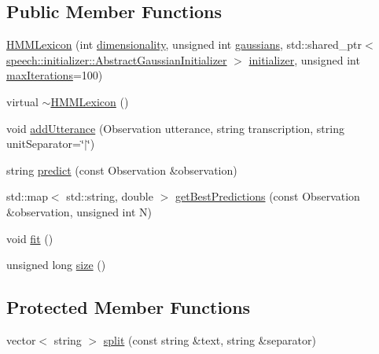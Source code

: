 \subsection*{Public Member Functions}
\begin{DoxyCompactItemize}
\item 
\hyperlink{classspeech_1_1HMMLexicon_a720b99df01bd818f36cd9437ec83ce72}{H\+M\+M\+Lexicon} (int \hyperlink{classspeech_1_1HMMLexicon_a0e8247e6ee089aced3287ec0488e927b}{dimensionality}, unsigned int \hyperlink{classspeech_1_1HMMLexicon_a31c5dc5af41ea8a1f7ef825b2581b4d6}{gaussians}, std\+::shared\+\_\+ptr$<$ \hyperlink{classspeech_1_1initializer_1_1AbstractGaussianInitializer}{speech\+::initializer\+::\+Abstract\+Gaussian\+Initializer} $>$ \hyperlink{classspeech_1_1HMMLexicon_a12d561355a3c03df3d6500c422c1b821}{initializer}, unsigned int \hyperlink{classspeech_1_1HMMLexicon_a4f7a5e08c169ca9f5a389f25c6fc5972}{max\+Iterations}=100)
\item 
virtual \hyperlink{classspeech_1_1HMMLexicon_a07f9cfec2db8467b98c016b7e90f85d8}{$\sim$\+H\+M\+M\+Lexicon} ()
\item 
void \hyperlink{classspeech_1_1HMMLexicon_ae8b1812cf8ee22d64b87861f71f39ce2}{add\+Utterance} (Observation utterance, string transcription, string unit\+Separator=\char`\"{}$\vert$\char`\"{})
\item 
string \hyperlink{classspeech_1_1HMMLexicon_a6c9f0b864f71efd3946f760f3b955c6c}{predict} (const Observation \&observation)
\item 
std\+::map$<$ std\+::string, double $>$ \hyperlink{classspeech_1_1HMMLexicon_ab8d36b52d200a08213577aa72e85dbfe}{get\+Best\+Predictions} (const Observation \&observation, unsigned int N)
\item 
void \hyperlink{classspeech_1_1HMMLexicon_ab8858456fd0f64bf13fac21f2b30a317}{fit} ()
\item 
unsigned long \hyperlink{classspeech_1_1HMMLexicon_a834c97dbcac695589f117c2252101f88}{size} ()
\end{DoxyCompactItemize}
\subsection*{Protected Member Functions}
\begin{DoxyCompactItemize}
\item 
vector$<$ string $>$ \hyperlink{classspeech_1_1HMMLexicon_a36f384430151123b2a27b532fcb24d46}{split} (const string \&text, string \&separator)
\end{DoxyCompactItemize}
